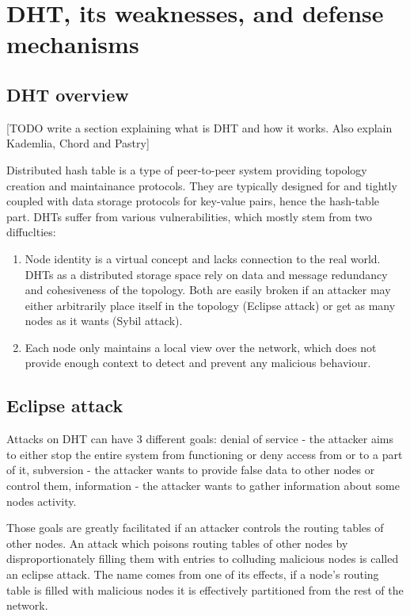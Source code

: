 \chapter{DHT, its weaknesses, and defense mechanisms}
\section{DHT overview}
  [TODO write a section explaining what is DHT and how it works. Also
    explain Kademlia, Chord and Pastry]

  Distributed hash table is a type of peer-to-peer system providing topology
  creation and maintainance protocols. They are typically designed for and
  tightly coupled with data storage protocols for key-value pairs, hence the
  hash-table part. DHTs suffer from various vulnerabilities, which mostly stem
  from two diffuclties:
  \begin{enumerate}
    \item Node identity is a virtual concept and lacks connection to the real
      world. DHTs as a distributed storage space rely on data and message
      redundancy and cohesiveness of the topology. Both are easily broken if an
      attacker may either arbitrarily place itself in the topology (Eclipse
      attack) or get as many nodes as it wants (Sybil attack).

    \item Each node only maintains a local view over the network, which does not
      provide enough context to detect and prevent any malicious behaviour.
  \end{enumerate}

\section{Eclipse attack}
  Attacks on DHT can have 3 different goals:
  denial of service - the attacker aims to either stop the entire system from
  functioning or deny access from or to a part of it,
  subversion - the attacker wants to provide false data to other nodes or
  control them,
  information - the attacker wants to gather information about some nodes
  activity.

  Those goals are greatly facilitated if an attacker controls the routing tables
  of other nodes. An attack which poisons routing tables of other nodes by
  disproportionately filling them with entries to colluding malicious nodes is
  called an eclipse attack. The name comes from one of its effects, if a node's
  routing table is filled with malicious nodes it is effectively partitioned
  from the rest of the network.

